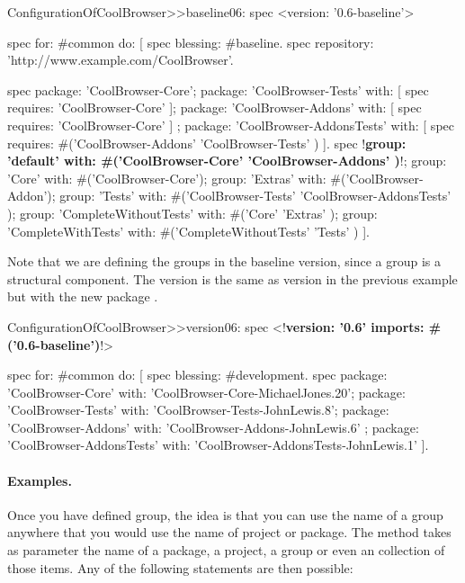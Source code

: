 \documentclass[a4paper,10pt,twoside]{book}
\begin{document}
\begin{code}{}
ConfigurationOfCoolBrowser>>baseline06: spec 
	<version: '0.6-baseline'>
	
	spec for: #common do: [
		spec blessing: #baseline.
		spec repository: 'http://www.example.com/CoolBrowser'.
		
		spec 
			package: 'CoolBrowser-Core';
			package: 'CoolBrowser-Tests' with: [ spec requires: 'CoolBrowser-Core' ];
			package: 'CoolBrowser-Addons' with: [ spec requires: 'CoolBrowser-Core' ] ;
			package: 'CoolBrowser-AddonsTests' with: [ 
				spec requires: #('CoolBrowser-Addons' 'CoolBrowser-Tests' ) ].
		spec 
			!\textbf{group: 'default' with: \#('CoolBrowser-Core' 'CoolBrowser-Addons' )}!;
			group: 'Core' with: #('CoolBrowser-Core');
			group: 'Extras' with: #('CoolBrowser-Addon');
			group: 'Tests' with: #('CoolBrowser-Tests' 'CoolBrowser-AddonsTests' );
			group: 'CompleteWithoutTests' with: #('Core' 'Extras' );
			group: 'CompleteWithTests' with: #('CompleteWithoutTests' 'Tests' )
		 ].
\end{code}






 
Note that we are defining the groups in the baseline version, since a group is a structural component. The version  is the same as version in the previous example but with the new package .
 
\begin{code}{}
ConfigurationOfCoolBrowser>>version06: spec 
	<!\textbf{version: '0.6' imports: \#('0.6-baseline')}!>
	
	spec for: #common do: [
		spec blessing: #development.
		spec 
			package: 'CoolBrowser-Core' with: 'CoolBrowser-Core-MichaelJones.20';
			package: 'CoolBrowser-Tests' with: 'CoolBrowser-Tests-JohnLewis.8';
			package: 'CoolBrowser-Addons' with: 'CoolBrowser-Addons-JohnLewis.6' ;
			package: 'CoolBrowser-AddonsTests' with: 'CoolBrowser-AddonsTests-JohnLewis.1' ].
\end{code}
 

\paragraph{Examples.} Once you have defined group, the idea is that you can use the name of a group anywhere that you would use the name of project or package. The   method takes as parameter the name of a package, a project, a group or even an collection of those items.  Any of the following statements are then possible:
\end{document}
